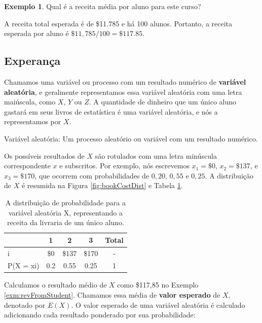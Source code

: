 \documentclass[
]{book}
\theoremstyle{definition}
\theoremstyle{definition}
\newtheorem{example}{Exemplo}[chapter]
\theoremstyle{definition}
\theoremstyle{definition}
\theoremstyle{remark}
\begin{document}
\begin{example}
\protect\hypertarget{exm:revFromStudent}{}{\label{exm:revFromStudent} }Qual é a receita média por aluno para este curso?
\end{example}

A receita total esperada é de \$11.785 e há 100 alunos. Portanto, a receita esperada por aluno é \(\$11,785/100 = \$117.85\).

\hypertarget{expectation}{%
\subsection{Experança}\label{expectation}}

Chamamos uma variável ou processo com um resultado numérico de \textbf{variável aleatória}, e geralmente representamos essa variável aleatória com uma letra maiúscula, como \(X\), \(Y\) ou \(Z\). A quantidade de dinheiro que um único aluno gastará em seus livros de estatística é uma variável aleatória, e nós a representamos por \(X\).

Variável aleatória: Um processo aleatório ou variável com um resultado numérico.

Os possíveis resultados de \(X\) são rotulados com uma letra minúscula correspondente \(x\) e subscritos. Por exemplo, nós escrevemos \(x_1=\$0\), \(x_2=\$137\), e \(x_3=\$170\), que ocorrem com probabilidades de \(0,20\), \(0,55\) e \(0,25\). A distribuição de \(X\) é resumida na Figura \ref{fig:bookCostDist} e Tabela \ref{tab:statSpendDist}.

\begin{table}

\caption{\label{tab:statSpendDist}A distribuição de probabilidade para a variável aleatória X, representando a receita da livraria de um único aluno.}
\centering
\begin{tabular}[t]{l|c|c|c|c}
\hline
  & 1 & 2 & 3 & Total\\
\hline
i & \$0 & \$137 & \$170 & -\\
\hline
P(X = xi) & 0.2 & 0.55 & 0.25 & 1\\
\hline
\end{tabular}
\end{table}

Calculamos o resultado médio de \(X\) como \$117,85 no Exemplo \ref{exm:revFromStudent}. Chamamos essa média de \textbf{valor esperado} de \(X\), denotado por \(E(X)\). O valor esperado de uma variável aleatória é calculado adicionando cada resultado ponderado por sua probabilidade:
\end{document}
